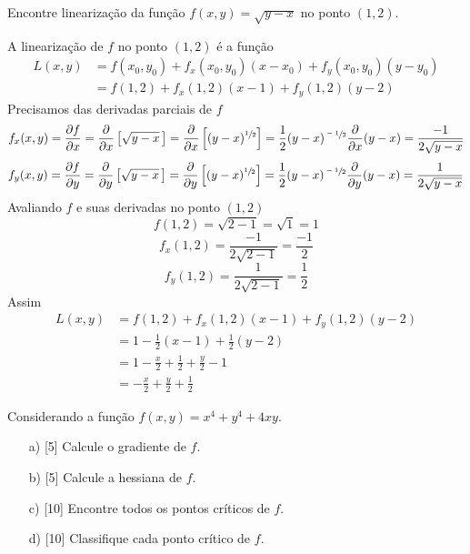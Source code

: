 \documentclass[a4paper,12pt,fleqn]{article}
\newcommand{\D}[2]{\frac{\partial {#1}}{\partial {#2}}}
\begin{document}
Encontre linearização da função
\(
  f(x, y) = \sqrt{y-x}
\)
no ponto \((1, 2)\).

\begin{answer}
  A linearização de $f$ no ponto \((1, 2)\) é a função
  \begin{align*}
    L(x, y)
    & = f(x_0, y_0) + f_x(x_0, y_0)(x-x_0) + f_y(x_0, y_0)(y-y_0) \\
    & = f(1, 2) + f_x(1, 2)(x-1) + f_y(1, 2)(y-2)
  \end{align*}
  Precisamos das derivadas parciais de $f$
  \[
    f_x(x, y)
    = \D{f}{x}
    = \D{}{x}\left[\sqrt{y-x}\,\right]
    = \D{}{x}\left[(y-x)^{\sfrac{1}{2}}\right]
    = \frac{1}{2}(y-x)^{\sfrac{-1}{2}}\D{}{x}(y-x)
    = \frac{-1}{2\sqrt{y-x}}
  \]
  \[
    f_y(x, y)
    = \D{f}{y}
    = \D{}{y}\left[\sqrt{y-x}\,\right]
    = \D{}{y}\left[(y-x)^{\sfrac{1}{2}}\right]
    = \frac{1}{2}(y-x)^{\sfrac{-1}{2}}\D{}{y}(y-x)
    = \frac{1}{2\sqrt{y-x}}
  \]
  Avaliando $f$ e suas derivadas no ponto $(1, 2)$
  \[
    f(1, 2)
    = \sqrt{2-1}
    = \sqrt{1}
    = 1
  \]
  \[
    f_x(1, 2)
    = \frac{-1}{2\sqrt{2-1}}
    = \frac{-1}{2}
  \]
  \[
    f_y(1, 2)
    = \frac{1}{2\sqrt{2-1}}
    = \frac{1}{2}
  \]
  Assim
  \begin{align*}
    L(x, y)
    & = f(1, 2) + f_x(1, 2)(x-1) + f_y(1, 2)(y-2) \\
    & = 1 -\frac{1}{2}(x-1) + \frac{1}{2}(y-2) \\
    & = 1 -\frac{x}{2} + \frac{1}{2} + \frac{y}{2} - 1 \\
    & = -\frac{x}{2} + \frac{y}{2} + \frac{1}{2}
  \end{align*}
  \clearpage
\end{answer}


Considerando a função
\(
  f(x, y) = x^4 + y^4 + 4xy
\).
\begin{enumerate}[leftmargin=15mm,labelwidth=11.5mm,align=left]
  \item[a) {[5]}] Calcule o gradiente de $f$.
  \item[b) {[5]}] Calcule a hessiana de $f$.
  \item[c) {[10]}] Encontre todos os pontos críticos de $f$.
  \item[d) {[10]}] Classifique cada ponto crítico de $f$.
\end{enumerate}
\end{document}
